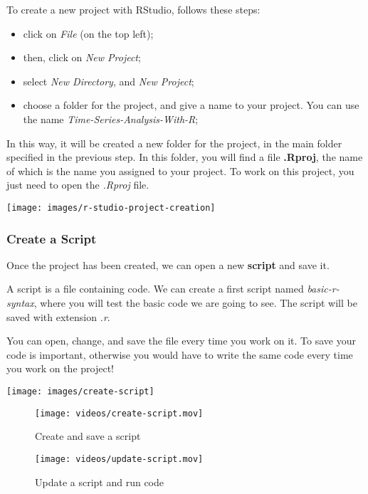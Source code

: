\documentclass[
]{article}
\providecommand{\tightlist}{%
  \setlength{\itemsep}{0pt}\setlength{\parskip}{0pt}}
\begin{document}
To create a new project with RStudio, follows these steps:

\begin{itemize}
\tightlist
\item
  click on \emph{File} (on the top left);
\item
  then, click on \emph{New Project};
\item
  select \emph{New Directory}, and \emph{New Project};
\item
  choose a folder for the project, and give a name to your project. You can use the name \emph{Time-Series-Analysis-With-R};
\end{itemize}

In this way, it will be created a new folder for the project, in the main folder specified in the previous step. In this folder, you will find a file \textbf{.Rproj}, the name of which is the name you assigned to your project. To work on this project, you just need to open the \emph{.Rproj} file.

\texttt{[image: images/r-studio-project-creation]}

\subsubsection{Create a Script}\label{create-a-script}

Once the project has been created, we can open a new \textbf{script} and save it.

A script is a file containing code. We can create a first script named \emph{basic-r-syntax}, where you will test the basic code we are going to see. The script will be saved with extension \emph{.r}.

You can open, change, and save the file every time you work on it.
To save your code is important, otherwise you would have to write the same code every time you work on the project!

\texttt{[image: images/create-script]}

\begin{figure}
\centering
\texttt{[image: videos/create-script.mov]}
\caption{Create and save a script}
\end{figure}

\begin{figure}
\centering
\texttt{[image: videos/update-script.mov]}
\caption{Update a script and run code}
\end{figure}
\end{document}
